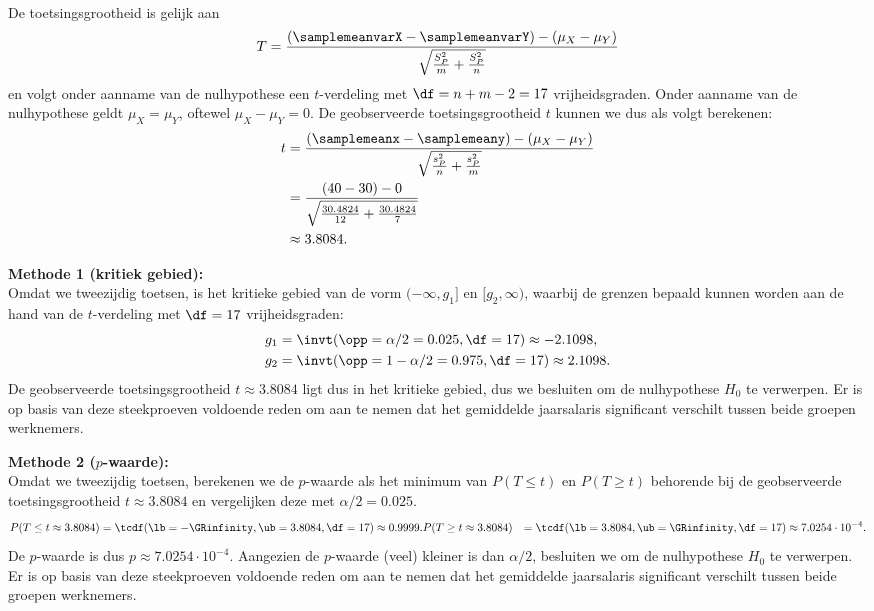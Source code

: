 {\begin{align*}
    \end{align*}
    De toetsingsgrootheid is gelijk aan
    \[
        T = \frac{(\samplemeanvarX - \samplemeanvarY) - (\mu_X - \mu_Y)}{\sqrt{\frac{S_P^2}{m}+\frac{S_P^2}{n}}}
    \]
    en volgt onder aanname van de nulhypothese een $t$-verdeling met $\df = n + m - 2 = 17$ vrijheidsgraden.
    Onder aanname van de nulhypothese geldt $\mu_X = \mu_Y$, oftewel $\mu_X - \mu_Y = 0$.
    De geobserveerde toetsingsgrootheid $t$ kunnen we dus als volgt berekenen:
    \begin{align*}
        t   &= \frac{(\samplemeanx - \samplemeany) - (\mu_X - \mu_Y)}{\sqrt{\frac{s_P^2}{n} + \frac{s_P^2}{m}}} \\
            &= \frac{(40 - 30) - 0}{\sqrt{\frac{30.4824}{12} + \frac{30.4824}{7}}} \\
            &\approx 3.8084.
    \end{align*}

    {\noindent\bfseries Methode 1 (kritiek gebied):}\\
    Omdat we tweezijdig toetsen, is het kritieke gebied van de vorm $(-\infty, g_1]$ en $[g_2, \infty)$, waarbij de grenzen bepaald kunnen worden 
    aan de hand van de $t$-verdeling met $\df=17$ vrijheidsgraden:
    \begin{align*}
        g_1 &= \invt(\opp=\alpha/2=0.025, \df=17) \approx -2.1098, \\
        g_2 &= \invt(\opp=1-\alpha/2=0.975, \df=17) \approx 2.1098.
    \end{align*}
    De geobserveerde toetsingsgrootheid $t \approx 3.8084$ ligt dus in het kritieke gebied, dus we besluiten om de nulhypothese $H_0$ te verwerpen.
    Er is op basis van deze steekproeven voldoende reden om aan te nemen dat het gemiddelde jaarsalaris significant verschilt tussen beide groepen werknemers.\\
    \medskip

    {\noindent\bfseries Methode 2 ($p$-waarde):}\\
    Omdat we tweezijdig toetsen, berekenen we de $p$-waarde als het minimum van $P(T \leq t)$ en $P(T \geq t)$ behorende bij de geobserveerde toetsingsgrootheid $t\approx 3.8084$ 
    en vergelijken deze met $\alpha/2 = 0.025$.
    \begin{align*}
        P(T \leq t \approx 3.8084) &= \tcdf(\lb=-\GRinfinity, \ub=3.8084, \df=17) \approx 0.9999.
        P(T \geq t \approx 3.8084) &= \tcdf(\lb=3.8084, \ub=\GRinfinity, \df=17) \approx 7.0254 \cdot 10^{-4}.
    \end{align*}
    De $p$-waarde is dus $p \approx 7.0254 \cdot 10^{-4}$.
    Aangezien de $p$-waarde (veel) kleiner is dan $\alpha/2$, besluiten we om de nulhypothese $H_0$ te verwerpen.
    Er is op basis van deze steekproeven voldoende reden om aan te nemen dat het gemiddelde jaarsalaris significant verschilt tussen beide groepen werknemers.
}